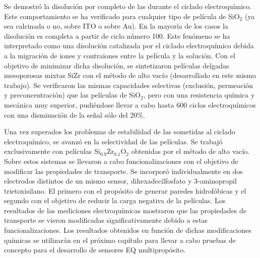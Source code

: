 	Se demostró la disolución por completo de las \pdmF\space durante el ciclado electroquímico. Este comportamiento se ha verificado para cualquier tipo de película de SiO$_2$ (ya sea calcinada o no, sobre ITO o sobre Au). En la mayoría de los casos la disolución es completa a partir de ciclo número 100. Este fenómeno se ha interpretado como una disolución catalizada por el ciclado electroquímico debida a la migración de iones y contraiones entre la película y la solución. Con el objetivo de minimizar dicha disolución, se sintetizaron películas delgadas mesoporosas mixtas Si\textbar Zr con el método de alto vacío (desarrollado en este mismo trabajo). Se verificaron las mismas capacidades selectivas (exclusión, permeación y preconcentración) que las películas de SiO$_2$, pero con una resistencia química y mecánica muy superior, pudiéndose llevar a cabo hasta 600 ciclos electroquímicos con una disminución de la señal sólo del 20\%.

	Una vez superados los problemas de estabilidad de las \pdm\space sometidas al ciclado electroquímico, se avanzó en la selectividad de las películas. Se trabajó exclusivamente con películas Si$_{0.9}$Zr$_{0.1}$O$_2$ obtenidas por el método de alto vacío. Sobre estos sistemas se llevaron a cabo funcionalizaciones con el objetivo de modificar las propiedades de transporte. Se incorporó individualmente en dos electrodos distintos de un mismo sensor, dihexadecilfosfato y 3-aminopropil trietoxisilano. El primero con el propósito de generar paredes hidrofóbicas y el segundo con el objetivo de reducir la carga negativa de la películas. Los resultados de las mediciones electroquímicas mostraron que las propiedades de transporte se vieron modificadas significativamente debido a estas funcionalizaciones. Los resultados obtenidos en función de dichas modificaciones químicas se utilizarán en el próximo capítulo para llevar a cabo pruebas de concepto para el desarrollo de sensores EQ multipropósito.




